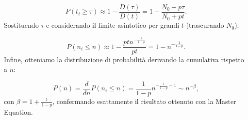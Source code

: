 \begin{equation}
    P(t_i \ge \tau) \approx 1 - \frac{D(\tau)}{D(t)} = 1 - \frac{N_0 + p\tau}{N_0 + pt}.
\end{equation}
Sostituendo $\tau$ e considerando il limite asintotico per grandi $t$ (trascurando $N_0$):

\begin{equation}
    P(n_i \le n) \approx 1 - \frac{p t n^{-\frac{1}{1-p}}}{p t} = 1 - n^{-\frac{1}{1-p}}.
\end{equation}
Infine, otteniamo la distribuzione di probabilità derivando la cumulativa rispetto a $n$:

\begin{equation}
    P(n) = \frac{d}{dn} P(n_i \le n) = \frac{1}{1-p} n^{-\frac{1}{1-p}-1} \sim n^{-\beta},
\end{equation}
con $\beta = 1 + \frac{1}{1-p}$, confermando esattamente il risultato ottenuto con la Master Equation.
